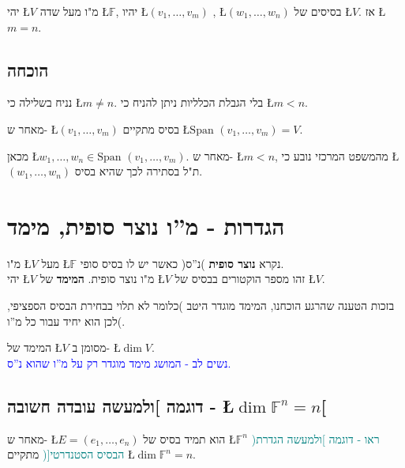 \documentclass[english,hebrew]{article}
\newcommand{\spn}{\text{Span }}
\begin{document}
יהי \L{$V$} מ"ו מעל שדה \L{$\mathbb{F}$}, יהיו \L{$(v_{1},\dots,v_{m})$}
, \L{$(w_{1},\dots,w_{n})$} בסיסים של \L{$V$}. אז \L{$m=n$}.

\subsection{הוכחה}

נניח בשלילה כי \L{$m\neq n$}. בלי הגבלת הכלליות ניתן להניח כי \L{$m<n$}.

מאחר ש- \L{$(v_{1},\dots,v_{m})$} בסיס מתקיים \L{$\spn(v_{1},\dots,v_{m})=V$}.

מכאן \L{$w_{1},\dots,w_{n}\in\spn(v_{1},\dots,v_{m})$}. מאחר ש- \L{$m<n$},
מהמשפט המרכזי נובע כי \L{$(w_{1},\dots,w_{n})$} ת"ל בסתירה לכך שהיא
בסיס.

\section{הגדרות - מ\textquotedblright ו נוצר סופית, מימד}

מ"ו \L{$V$} מעל \L{$\mathbb{F}$} נקרא \textbf{נוצר סופית} )נ\textquotedblright ס(
כאשר יש לו בסיס סופי.\\

יהי \L{$V$} מ"ו נוצר סופית. \textbf{המימד} של \L{$V$} זהו מספר
הוקטורים בבסיס של \L{$V$}.

בזכות הטענה שהרגע הוכחנו, המימד מוגדר היטב )כלומר לא תלוי בבחירת הבסיס
הספציפי, לכן הוא יחיד עבור כל מ\textquotedblright ו(.

המימד של \L{$V$} מסומן ב- \L{$\dim V$}.\\

\textcolor{blue}{נשים לב - המושג מימד מוגדר רק על מ\textquotedblright ו
שהוא נ\textquotedblright ס. }

\subsection{דוגמה {]}ולמעשה עובדה חשובה - \L{$\dim\mathbb{F}^{n}=n$}{[}}

מאחר ש- \L{$E=(e_{1},\dots,e_{n})$} הוא תמיד בסיס של \L{$\mathbb{F}^{n}$}
\textcolor{teal}{)ראו - דוגמה {]}ולמעשה הגדרת הבסיס הסטנדרטי{[}(}
מתקיים \L{$\dim\mathbb{F}^{n}=n$}.

\newpage{}

\noindent{}
\end{document}
